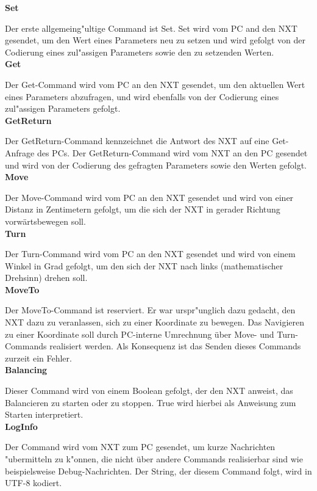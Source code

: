 \documentclass[oneside,abstractoff,a4paper]{scrartcl}
\begin{document}
\noindent\textbf{Set}

Der erste allgemeing"ultige Command ist Set. Set wird vom PC and den NXT gesendet, um den Wert eines Parameters neu zu setzen und wird gefolgt von der Codierung eines zul"assigen Parameters sowie den zu setzenden Werten. \\ 

\noindent\textbf{Get}

Der Get-Command wird vom PC an den NXT gesendet, um den aktuellen Wert eines Parameters abzufragen, und wird ebenfalls von der Codierung eines zul"assigen Parameters gefolgt. \\

\noindent\textbf{GetReturn}

Der GetReturn-Command kennzeichnet die Antwort des NXT auf eine Get-Anfrage des PCs. Der GetReturn-Command wird vom NXT an den PC gesendet und wird von der Codierung des gefragten Parameters sowie den Werten gefolgt. \\

\noindent\textbf{Move}

Der Move-Command wird vom PC an den NXT gesendet und wird von einer Distanz in Zentimetern gefolgt, um die sich der NXT in gerader Richtung vorwärtsbewegen soll. \\

\noindent\textbf{Turn}

Der Turn-Command wird vom PC an den NXT gesendet und wird von einem Winkel in Grad gefolgt, um den sich der NXT nach links (mathematischer Drehsinn) drehen soll. \\

\noindent\textbf{MoveTo}

Der MoveTo-Command ist reserviert. Er war urspr"unglich dazu gedacht, den NXT dazu zu veranlassen, sich zu einer Koordinate zu bewegen. Das Navigieren zu einer Koordinate soll durch PC-interne Umrechnung über Move- und Turn-Commands realisiert werden. Als Konsequenz ist das Senden dieses Commands zurzeit ein Fehler. \\

\noindent\textbf{Balancing}

Dieser Command wird von einem Boolean gefolgt, der den NXT anweist, das Balancieren zu starten oder zu stoppen. True wird hierbei als Anweisung zum Starten interpretiert. \\

\noindent\textbf{LogInfo}

Der Command wird vom NXT zum PC gesendet, um kurze Nachrichten "ubermitteln zu k"onnen, die nicht über andere Commands realisierbar sind wie beispielsweise Debug-Nachrichten. Der String, der diesem Command folgt, wird in UTF-8 kodiert. \\
\end{document}
